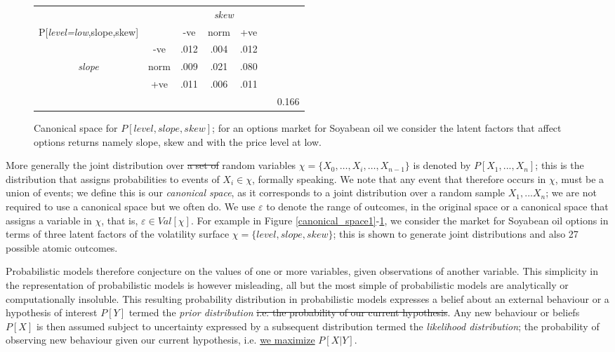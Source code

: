 \documentclass[7pt]{article}
\begin{document}
\begin{figure*}
\begin{minipage}[t]{0.52\textwidth}
\centering
\vspace{20 mm}
\begin{tabular}{ c | c |c c c c||c} 
																		&				&  	\multicolumn{4}{c}{\emph{skew}}\\
P[\emph{level=low},slope,skew]						 &	 			  &  -ve  		   &  	norm	  & +ve 		& &\\ 
\hline
																		& -ve	      & .012 	      & .004             & .012  	   	 &  &\\
\emph{slope}	 												& norm    	& .009  	    & .021             & .080 		  & & \\
																		& +ve	   	 & .011   	      & .006             & .011  		 & &\\
\hline
\hline
																		& 			     &  		       & 					& 				  &  & 0.166\\
\end{tabular}

\caption{Canonical space for  $P[{level},slope,skew]$; for an options market for Soyabean oil we consider the latent factors that affect options returns namely slope, skew and with the price {level at low}.}
\label{canonical_space}
\end{minipage}
\end{figure*}

More generally the joint distribution over \st{a set of} random variables $\chi = \{ X_0,…,X_i, …, X_{n-1} \}$ is denoted by $P [ X_1, ... , X_n ]$; this is the distribution that assigns probabilities to events of $X_i \in \chi$, formally speaking. We note that any event that therefore occurs in $\chi$, must be a union of events; we define this is our \emph{canonical space}, as it corresponds to a joint distribution over a random sample ${X_1,...X_n}$; 	we are not required to use a canonical space but we often do. We use $\varepsilon$ to denote the range of outcomes, in the original space or a canonical space that assigns a variable in $\chi$, that is, $\varepsilon \in Val[\chi]$. For example in Figure \ref{canonical_space1}-\ref{canonical_space}, we consider the market for Soyabean oil options in terms of three latent factors of the volatility surface $\chi = \{ level, slope, skew \}$; this is shown to generate joint distributions and also 27 possible atomic outcomes. 

Probabilistic models therefore conjecture on the values of one or more variables, given observations of  another variable. This simplicity in the representation of probabilistic models is however misleading, all but the most simple of probabilistic models are analytically or computationally insoluble. This resulting probability distribution in probabilistic models  expresses a belief about an external behaviour or a hypothesis of interest $P[Y]$ termed the \emph{prior distribution} \st{i.e. the probability of our current hypothesis}. Any new behaviour or beliefs $P[X]$ is then assumed subject to uncertainty expressed by a subsequent distribution termed the \emph{likelihood distribution}; the probability of observing  new behaviour given our current hypothesis, i.e. \underline{we maximize} $P[X | Y]$.  
\end{document}
